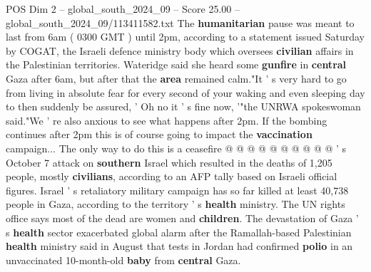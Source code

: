 \begin{textsample}{POS Dim 2 – global\_south\_2024\_09 – Score 25.00 – global\_south\_2024\_09/113411582.txt}
The \textbf{humanitarian} pause was meant to last from 6am ( 0300 GMT ) until 2pm, according to a statement issued Saturday by COGAT, the Israeli defence ministry body which oversees \textbf{civilian} affairs in the Palestinian territories.
Wateridge said she heard some \textbf{gunfire} in \textbf{central} Gaza after 6am, but after that the \textbf{area} remained calm."It ' s very hard to go from living in absolute fear for every second of your waking and even sleeping day to then suddenly be assured, ' Oh no it ' s fine now, '"the UNRWA spokeswoman said."We ' re also anxious to see what happens after 2pm.
If the bombing continues after 2pm this is of course going to impact the \textbf{vaccination} campaign...
The only way to do this is a ceasefire @ @ @ @ @ @ @ @ @ @ ' s October 7 attack on \textbf{southern} Israel which resulted in the deaths of 1,205 people, mostly \textbf{civilians}, according to an AFP tally based on Israeli official figures.
Israel ' s retaliatory military campaign has so far killed at least 40,738 people in Gaza, according to the territory ' s \textbf{health} ministry.
The UN rights office says most of the dead are women and \textbf{children}.
The devastation of Gaza ' s \textbf{health} sector exacerbated global alarm after the Ramallah-based Palestinian \textbf{health} ministry said in August that tests in Jordan had confirmed \textbf{polio} in an unvaccinated 10-month-old \textbf{baby} from \textbf{central} Gaza.

\end{textsample}
